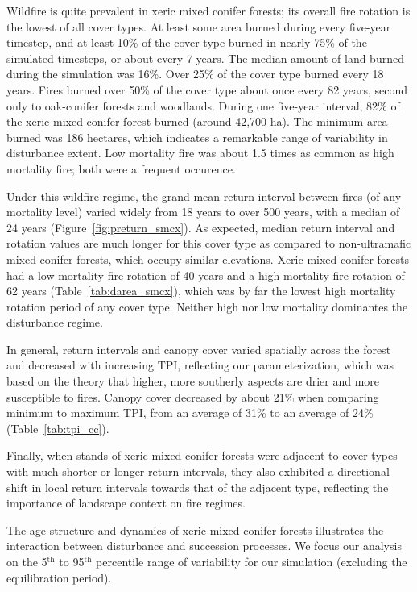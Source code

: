 Wildfire is quite prevalent in xeric mixed conifer forests; its overall fire rotation is the lowest of all cover types. At least some area burned during every five-year timestep, and at least 10\% of the cover type burned in nearly 75\% of the simulated timesteps, or about every 7 years. The median amount of land burned during the simulation was 16\%. Over 25\% of the cover type burned every 18 years. Fires burned over 50\% of the cover type about once every 82 years, second only to oak-conifer forests and woodlands. During one five-year interval, 82\% of the xeric mixed conifer forest burned (around 42,700 ha). The minimum area burned was 186 hectares, which indicates a remarkable range of variability in disturbance extent. Low mortality fire was about 1.5 times as common as high mortality fire; both were a frequent occurence.

Under this wildfire regime, the grand mean return interval between fires (of any mortality level) varied widely from 18 years to over 500 years, with a median of 24 years (Figure~\ref{fig:preturn_smcx}). As expected, median return interval and rotation values are much longer for this cover type as compared to non-ultramafic mixed conifer forests, which occupy similar elevations. Xeric mixed conifer forests had a low mortality fire rotation of 40 years and a high mortality fire rotation of 62 years (Table~\ref{tab:darea_smcx}), which was by far the lowest high mortality rotation period of any cover type. Neither high nor low mortality dominantes the disturbance regime.

In general, return intervals and canopy cover varied spatially across the forest and decreased with increasing TPI, reflecting our parameterization, which was based on the theory that higher, more southerly aspects are drier and more susceptible to fires. Canopy cover decreased by about 21\% when comparing minimum to maximum TPI, from an average of 31\% to an average of 24\% (Table~\ref{tab:tpi_cc}). 

Finally, when stands of xeric mixed conifer forests were adjacent to cover types with much shorter or longer return intervals, they also exhibited a directional shift in local return intervals towards that of the adjacent type, reflecting the importance of landscape context on fire regimes.


The age structure and dynamics of xeric mixed conifer forests illustrates the interaction between disturbance and succession processes. We focus our analysis on the 5$^{\text{th}}$ to 95$^{\text{th}}$ percentile range of variability for our simulation (excluding the equilibration period).

